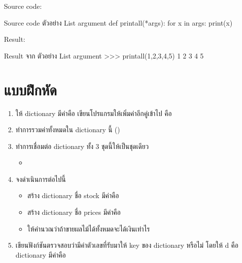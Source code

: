 Source code:
\begin{codelist}{Source code ตัวอย่าง List argument}{}
def printall(*args):
    for x in args:
        print(x)
\end{codelist}
Result:
\begin{codelist}{Result จาก ตัวอย่าง List argument}{}
>>> printall(1,2,3,4,5)
1
2
3
4
5
\end{codelist}

\section{แบบฝึกหัด}

\begin{enumerate} 
\item ให้ dictionary มีค่าคือ  เขียนโปรแกรมให้เพิ่มค่าอีกคู่เข้าไป คือ 
\item ทำการรวมค่าทั้งหมดใน dictionary นี้ ()
\item ทำการเชื่อมต่อ dictionary ทั้ง 3 ชุดนี้ให้เป็นชุดเดียว
	\begin{itemize}
		\item {}
	\end{itemize}
\item จงดำเนินการต่อไปนี้
	\begin{itemize}
		\item สร้าง dictionary ชื่อ stock มีค่าคือ 
		\item สร้าง dictionary ชื่อ prices มีค่าคือ 
		\item ให้คำนวณว่าถ้าขายผลไม้ได้ทั้งหมดจะได้เงินเท่าไร
	\end{itemize}
\item เขียนฟังก์ชันตรวจสอบว่ามีค่าตัวเลขที่รับมาให้ key ของ dictionary หรือไม่ โดยให้ d คือ dictionary มีค่าคือ 

\end{enumerate}
